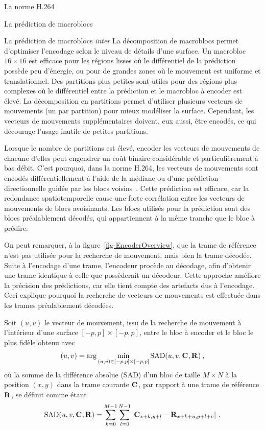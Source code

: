 \documentclass[letterpaper, twoside, 12pt,memoire]{thETS}
\newcommand{\fig}[1]{figure~\ref{#1}}
\begin{document}
\begin{chapter}{La norme H.264}
\begin{section}{La prédiction de macroblocs}
\begin{subsection}{La prédiction de macroblocs \textit{inter}}
La décomposition de macroblocs permet d'optimiser l'encodage selon le niveau de
détails d'une surface. Un macrobloc $16 \times 16$ est efficace pour les régions
lisses où le différentiel de la prédiction possède peu d'énergie, ou pour de
grandes zones où le mouvement est uniforme et translationnel. Des partitions
plus petites sont utiles pour des régions plus complexes où le différentiel
entre la prédiction et le macrobloc à encoder est élevé. La décomposition en
partitions permet d'utiliser plusieurs vecteurs de mouvements (un par partition)
pour mieux modéliser la surface. Cependant, les vecteurs de mouvements
supplémentaires doivent, eux aussi, être encodés, ce qui décourage l'usage
inutile de petites partitions.

Lorsque le nombre de partitions est élevé, encoder les vecteurs de mouvements de
chacune d'elles peut engendrer un coût binaire considérable et particulièrement
à bas débit. C'est pourquoi, dans la norme H.264, les vecteurs de mouvements
sont encodés différentiellement à l'aide de la médiane ou d'une prédiction
directionnelle guidée par les blocs voisins~\citep{wiegand2003}. Cette
prédiction est efficace, car la redondance spatiotemporelle cause une forte
corrélation entre les vecteurs de mouvements de blocs avoisinants. Les blocs
utilisés pour la prédiction sont des blocs préalablement décodés, qui
appartiennent à la même tranche que le bloc à prédire.

On peut remarquer, à la \fig{fig-EncoderOverview}, que la trame de référence
n'est pas utilisée pour la recherche de mouvement, mais bien la trame décodée.
Suite à l'encodage d'une trame, l'encodeur procède au décodage, afin d'obtenir
une trame identique à celle que possèderait un décodeur. Cette approche améliore
la précision des prédictions, car elle tient compte des artefacts dus à
l'encodage. Ceci explique pourquoi la recherche de vecteurs de mouvements est
effectuée dans les trames préalablement décodées.

Soit $(u,v)$ le vecteur de mouvement, issu de la recherche de mouvement à
l'intérieur d'une surface $[-p, p] \times [-p, p]$, entre le bloc à encoder et
le bloc le plus fidèle obtenu avec
\begin{equation}
\label{eq-Vectors}
(u, v) = \arg \min_{(u,v) \in [-p, p] \times [-p, p]} \textrm{SAD}(u, v, \mathbf{C}_{}, \mathbf{R}_{})
\:,
\end{equation}
où la somme de la différence absolue (SAD) d'un bloc de taille $M\times N$ à la position $(x,y)$
dans la trame courante $\mathbf{C}_{}$, par rapport à une trame de référence $\mathbf{R}_{}$,
se définit comme étant
\begin{equation}
\textrm{SAD}(u,v, \mathbf{C}_{}, \mathbf{R}_{}) = \sum_{k=0}^{M-1}\sum_{l=0}^{N-1} \left|
\mathbf{C}_{x+k,y+l} - \mathbf{R}_{x+k+u,y+l+v} \right|\:.
\end{equation}


\end{subsection}
\end{section}
\end{chapter}
\end{document}
